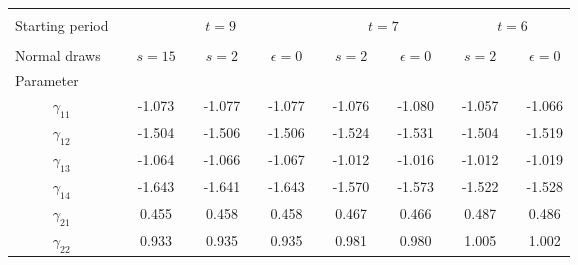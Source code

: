 \begin{tabular}{crccccccccccccc}
\toprule
\toprule
          &           &           &           &           &           &           &           &           &           &           &           &           &           &  \\
\multicolumn{1}{l}{Starting period} &           & \multicolumn{5}{c}{$t=9$}                                 &           & \multicolumn{3}{c}{$t=7$}         &           & \multicolumn{3}{c}{$t=6$} \\
\cmidrule{1-1}\cmidrule{3-7}\cmidrule{9-11}\cmidrule{13-15}          &           &           &           &           &           &           &           &           &           &           &           &           &           &  \\
\multicolumn{1}{l}{Normal draws} &           & $s=15$    &           & $s=2$     &           & $\epsilon=0$ &           & $s=2$     &           & $\epsilon=0$ &           & $s=2$     &           & $\epsilon=0$ \\
\cmidrule{1-1}\cmidrule{3-3}\cmidrule{5-5}\cmidrule{7-7}\cmidrule{9-9}\cmidrule{11-11}\cmidrule{13-13}\cmidrule{15-15}\multicolumn{1}{l}{Parameter} &           &           &           &           &           &           &           &           &           &           &           &           &           &  \\
$\gamma_{11}$ &           & -1.073    &           & -1.077    &           & -1.077    &           & -1.076    &           & -1.080    &           & -1.057    &           & -1.066 \\
$\gamma_{12}$ &           & -1.504    &           & -1.506    &           & -1.506    &           & -1.524    &           & -1.531    &           & -1.504    &           & -1.519 \\
$\gamma_{13}$ &           & -1.064    &           & -1.066    &           & -1.067    &           & -1.012    &           & -1.016    &           & -1.012    &           & -1.019 \\
$\gamma_{14}$ &           & -1.643    &           & -1.641    &           & -1.643    &           & -1.570    &           & -1.573    &           & -1.522    &           & -1.528 \\
$\gamma_{21}$ &           & 0.455     &           & 0.458     &           & 0.458     &           & 0.467     &           & 0.466     &           & 0.487     &           & 0.486 \\
$\gamma_{22}$ &           & 0.933     &           & 0.935     &           & 0.935     &           & 0.981     &           & 0.980     &           & 1.005     &           & 1.002 \\

\end{tabular}
